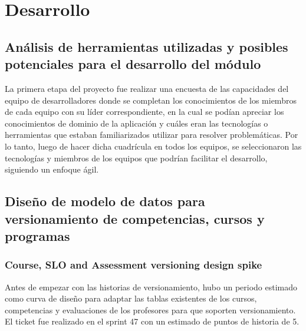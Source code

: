 \section{Desarrollo}
\subsection{Análisis de herramientas utilizadas y posibles potenciales para el desarrollo del módulo}
La primera etapa del proyecto fue realizar una encuesta de las capacidades del equipo de desarrolladores donde se completan los conocimientos de los miembros de cada equipo con su líder correspondiente, en la cual se podían apreciar los conocimientos de dominio de la aplicación y cuáles eran las tecnologías o herramientas que estaban familiarizados utilizar para resolver problemáticas. Por lo tanto, luego de hacer dicha cuadrícula en todos los equipos, se seleccionaron las tecnologías y miembros de los equipos que podrían facilitar el desarrollo, siguiendo un enfoque ágil.

\subsection{Diseño de modelo de datos para versionamiento de competencias, cursos y programas}
\subsubsection{Course, SLO and Assessment versioning design spike}
Antes de empezar con las historias de versionamiento, hubo un periodo estimado como curva de diseño para adaptar las tablas existentes de los cursos, competencias y evaluaciones de los profesores para que soporten versionamiento. El ticket fue realizado en el sprint 47 con un estimado de puntos de historia de 5.

